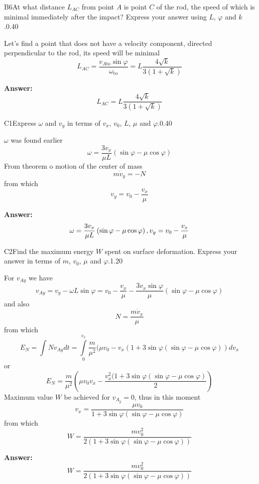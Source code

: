 \documentclass[11pt,a4paper]{article}
\begin{document}
\begin{solcard}{B6}{At what distance $L_{AC}$ from point $A$ is point $C$ of the rod, the speed of which is minimal immediately after the impact? Express your answer using $L$, $\varphi$ and $k$.}{0.40}

Let's find a point that does not have a velocity component, directed perpendicular to the rod, its speed will be minimal $$L_{AC}=\frac{v_{A\text{to}}\sin\varphi}{\omega_{\text{to}}}=L\frac{4\sqrt{k}}{3(1+\sqrt{k})} $$

\par\smallskip\noindent\textbf{Answer:} $$L_{AC}=L\frac{4\sqrt{k}}{3(1+\sqrt{k})} $$
\end{solcard}

\begin{solcard}{C1}{Express $\omega$ and $v_y$ in terms of $v_x$, $v_0$, $L$, $\mu$ and $\varphi$.}{0.40}

$\omega$ was found earlier $$\omega=\frac{3v_x}{\mu L}\left(\sin\varphi-\mu\cos\varphi\right) $$ From theorem o motion of the center of mass $$m\dot{v}_y=-N $$ from which $$v_y=v_0-\frac{v_x}{\mu} $$

\par\smallskip\noindent\textbf{Answer:} $$\omega=\frac{3v_x}{\mu L}\left(\sin\varphi-\mu\cos\varphi\right),\\v_y=v_0-\frac{v_x}{\mu} $$
\end{solcard}

\begin{solcard}{C2}{Find the maximum energy $W$ spent on surface deformation. Express your answer in terms of $m$, $v_0$, $\mu$ and $\varphi$.}{1.20}

For $v_{Ay}$ we have $$v_{Ay}=v_y-\omega L\sin\varphi=v_0-\frac{v_x}{\mu}-\frac{3v_x\sin\varphi}{\mu}\left(\sin\varphi-\mu\cos\varphi\right) $$ and also $$N=\frac{m\dot{v}_x}{\mu} $$ from which $$E_N=\int Nv_{Ay}dt=\int\limits_0^{v_x}\frac{m}{\mu^2}(\mu v_0-v_x(1+3\sin\varphi(\sin\varphi-\mu\cos\varphi))dv_x $$ or $$E_N=\frac{m}{\mu^2}\left(\mu v_0v_x-\frac{v^2_x(1+3\sin\varphi(\sin\varphi-\mu\cos\varphi)}{2}\right) $$ Maximum value $W$ be achieved for $v_{A_y}=0$, thus in this moment $$v_x=\frac{\mu v_0}{1+3\sin\varphi(\sin\varphi-\mu\cos\varphi)} $$ from which $$W=\frac{mv^2_0}{2(1+3\sin\varphi(\sin\varphi-\mu\cos\varphi))} $$

\par\smallskip\noindent\textbf{Answer:} $$W=\frac{mv^2_0}{2(1+3\sin\varphi(\sin\varphi-\mu\cos\varphi))} $$
\end{solcard}
\end{document}
